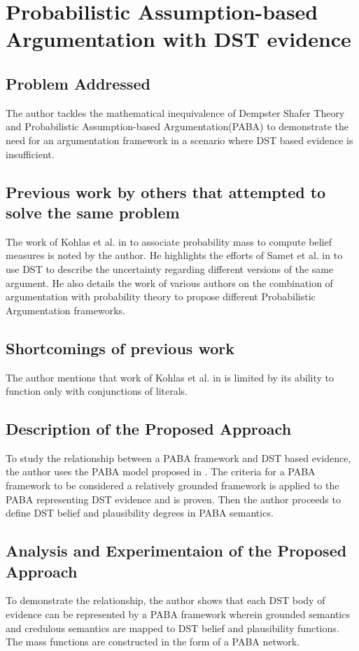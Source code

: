 \documentclass[UTF8]{article}
\begin{document}
\section{Probabilistic Assumption-based Argumentation with DST evidence}
\subsection{Problem Addressed}
The author tackles the mathematical inequivalence of Dempster Shafer Theory and Probabilistic Assumption-based Argumentation(PABA) to demonstrate the need for an argumentation framework in a scenario where DST based evidence is insufficient. 

\subsection{Previous work by others that attempted to solve the same problem}
The work of Kohlas et al. in \cite{Kohlas2002} to associate probability 
mass to compute belief measures is noted by the author. He highlights the efforts of Samet et al. in \cite{10.1007/978-3-319-40581-0_21} to use DST to describe the uncertainty regarding different versions of the same argument. He also details the work of various authors on the combination of argumentation with probability theory to propose different Probabilistic Argumentation frameworks.

\subsection{Shortcomings of previous work}
The author mentions that work of Kohlas et al. in \cite{Kohlas2002} is limited by its ability to function only with conjunctions of literals. 
\subsection{Description of the Proposed Approach}
To study the relationship between a PABA framework and DST based evidence, the author uses the PABA model proposed in \cite{Dung:2010:TAJ:1860828.1860846}.   The criteria for a PABA framework to be considered a relatively grounded framework is applied to the PABA representing DST evidence and is proven. Then the author proceeds to define DST belief and plausibility degrees in PABA semantics.

\subsection{Analysis and Experimentaion of the Proposed Approach}
To demonstrate the relationship, 
the author shows that each DST body of evidence can be represented by a PABA framework wherein grounded semantics and credulous semantics are mapped to DST belief and plausibility functions. The mass functions are 
constructed in the form of a PABA network.
\end{document}
